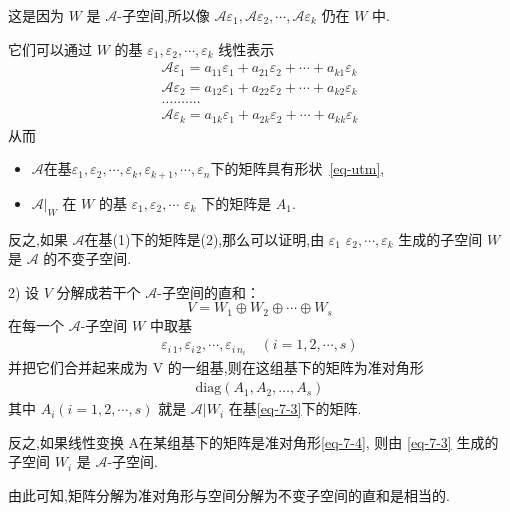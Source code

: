 \documentclass[13pt]{beamer}
\def\A{\mathscr{A}}
\begin{document}
\begin{frame}
这是因为 $W$ 是 $\A$-子空间,所以像 $\mathscr{A} {\varepsilon}_{1}, \mathscr{A} {\varepsilon}_{2}, \cdots, \mathscr{A} {\varepsilon}_{k}$ 仍在
$W$ 中. 

它们可以通过 $W$ 的基 ${\varepsilon}_{1}, {\varepsilon}_{2}, \cdots, {\varepsilon}_{k}$ 线性表示
\[
\begin{array}{l}
\mathscr{A} {\varepsilon}_{1}=a_{11} {\varepsilon}_{1}+a_{21} {\varepsilon}_{2}+\cdots+a_{k 1} {\varepsilon}_{k} \\
\mathscr{A} {\varepsilon}_{2}=a_{12} {\varepsilon}_{1}+a_{22} {\varepsilon}_{2}+\cdots+a_{k 2} {\varepsilon}_{k} \\
\ldots \ldots \ldots . \\
\mathscr{A} {\varepsilon}_{k}=a_{1 k} {\varepsilon}_{1}+a_{2 k} {\varepsilon}_{2}+\cdots+a_{k k} {\varepsilon}_{k}
\end{array}
\]
从而 
\begin{itemize}
\item 
$\A$在基${\varepsilon}_{1}, {\varepsilon}_{2}, \cdots, {\varepsilon}_{k}, {\varepsilon}_{k+1}, \cdots, {\varepsilon}_{n}$下的矩阵具有形状~\eqref{eq-utm}, 
\item
$\A|_W$ 在 $W$ 的基 ${\varepsilon}_{1}, {\varepsilon}_{2}, \cdots$
${\varepsilon}_{k}$ 下的矩阵是 ${A}_{1}$.\\[10pt]
\end{itemize}

反之,如果 $\A$在基(1)下的矩阵是(2),那么可以证明,由 ${\varepsilon}_{1}$ ${\varepsilon}_{2}, \cdots, {\varepsilon}_{k}$ 生成的子空间 $W$ 是 $\mathscr{A}$ 的不变子空间.
\end{frame}

\begin{frame}
2) 设 $V$ 分解成若干个 $\A$-子空间的直和：
$$
V=W_{1} \oplus W_{2} \oplus \cdots \oplus W_{s}
$$
在每一个 $\A$-子空间 $W$ 中取基
\begin{align}\label{eq-7-3}
{\varepsilon}_{i \, 1}, {\varepsilon}_{i \, 2}, \cdots, {\varepsilon}_{i \, n_{i}} \quad(i=1,2, \cdots, s)
\end{align}
并把它们合并起来成为 V 的一组基,则在这组基下的矩阵为准对角形
\begin{align}\label{eq-7-4}
\mbox{diag} \left(A_1, A_2, \ldots, A_s \right) 
\end{align}
其中 ${A}_{i}(i=1,2, \cdots, s)$ 就是 $\mathscr{A} | W_{i}$ 在基\eqref{eq-7-3}下的矩阵. 

反之,如果线性变换 A在某组基下的矩阵是准对角形\eqref{eq-7-4}, 则由
\eqref{eq-7-3} 生成的子空间 $W_{i}$ 是 $\mathscr{A}$-子空间.

由此可知,\alert{矩阵分解为准对角形}与\alert{空间分解为不变子空间的直和}是相当的.
\end{frame}
\end{document}
